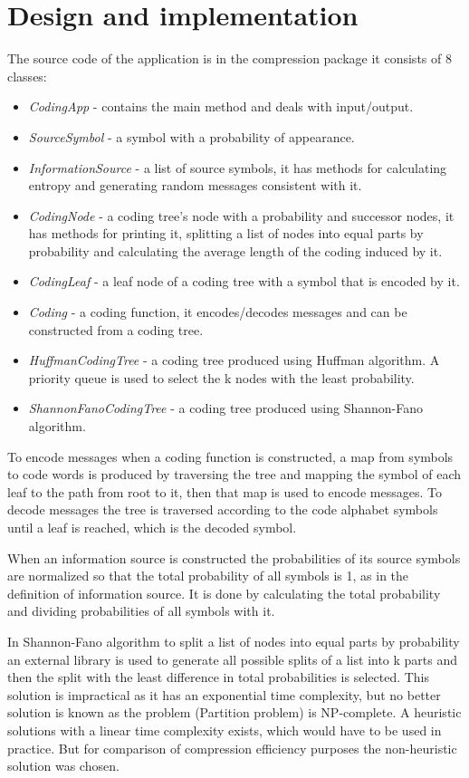 \documentclass{article}
\begin{document}
\section{Design and implementation}
The source code of the application is in the compression package it consists of 8 classes:
\begin{itemize}
	\item \textit{CodingApp} - contains the main method and deals with input/output.
	\item \textit{SourceSymbol} - a symbol with a probability of appearance.
	\item \textit{InformationSource} - a list of source symbols, it has methods for calculating entropy and generating random messages consistent with it.
	\item \textit{CodingNode} - a coding tree's node with a probability and successor nodes, it has methods for printing it, splitting a list of nodes into equal parts by probability and calculating the average length of the coding induced by it.
	\item \textit{CodingLeaf} - a leaf node of a coding tree with a symbol that is encoded by it.
	\item \textit{Coding} - a coding function, it encodes/decodes messages and can be constructed from a coding tree.
	\item \textit{HuffmanCodingTree} - a coding tree produced using Huffman algorithm. A priority queue is used to select the k nodes with the least probability.
	\item \textit{ShannonFanoCodingTree} - a coding tree produced using Shannon-Fano algorithm.
\end{itemize}
To encode messages when a coding function is constructed, a map from symbols to code words is produced by traversing the tree and mapping the symbol of each leaf to the path from root to it, then that map is used to encode messages. To decode messages the tree is traversed according to the code alphabet symbols until a leaf is reached, which is the decoded symbol.

When an information source is constructed the probabilities of its source symbols are normalized so that the total probability of all symbols is 1, as in the definition of information source. It is done by calculating the total probability and dividing probabilities of all symbols with it.

In Shannon-Fano algorithm to split a list of nodes into equal parts by probability an external library is used to generate all possible splits of a list into k parts and then the split with the least difference in total probabilities is selected. This solution is impractical as it has an exponential time complexity, but no better solution is known as the problem (Partition problem) is NP-complete. A heuristic solutions with a linear time complexity exists, which would have to be used in practice. But for comparison of compression efficiency purposes the non-heuristic solution was chosen.
\end{document}
